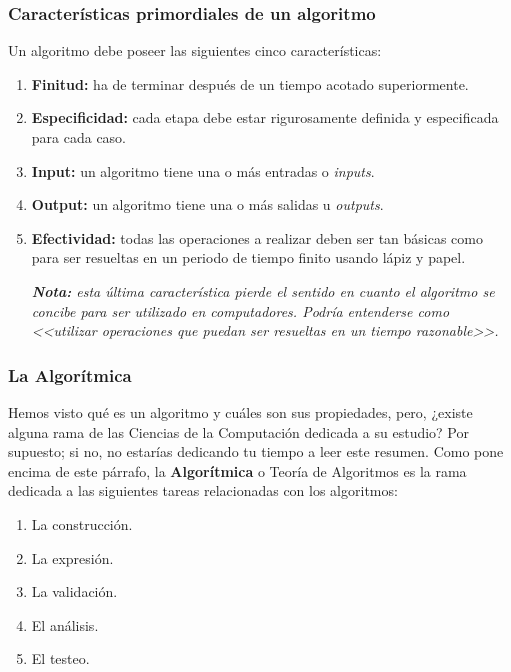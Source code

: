 \documentclass[11pt,a4paper]{article}
\begin{document}
\subsubsection{Características primordiales de un algoritmo}

Un algoritmo debe poseer las siguientes cinco características:

\begin{enumerate}
\item \textbf{Finitud:} ha de terminar después de un tiempo acotado superiormente.

\item \textbf{Especificidad:} cada etapa debe estar rigurosamente definida y especificada para cada caso.

\item \textbf{Input:} un algoritmo tiene una o más entradas o \textit{inputs}.

\item \textbf{Output:} un algoritmo tiene una o más salidas u \textit{outputs}.

\item \textbf{Efectividad:} todas las operaciones a realizar deben ser tan básicas como para ser resueltas en un periodo de tiempo finito usando lápiz y papel.

\textit{\textbf{Nota:} esta última característica pierde el sentido en cuanto el algoritmo se concibe para ser utilizado en computadores. Podría entenderse como <<utilizar operaciones que puedan ser resueltas en un tiempo razonable>>.}
\end{enumerate}


\subsubsection{La Algorítmica}

Hemos visto qué es un algoritmo y cuáles son sus propiedades, pero, ¿existe alguna rama de las Ciencias de la Computación dedicada a su estudio? Por supuesto; si no, no estarías dedicando tu tiempo a leer este resumen. Como pone encima de este párrafo, la \textbf{Algorítmica} o Teoría de Algoritmos es la rama dedicada a las siguientes tareas relacionadas con los algoritmos:

\begin{enumerate}
\item La construcción.
\item La expresión.
\item La validación.
\item El análisis.
\item El testeo.
\end{enumerate}
\end{document}
